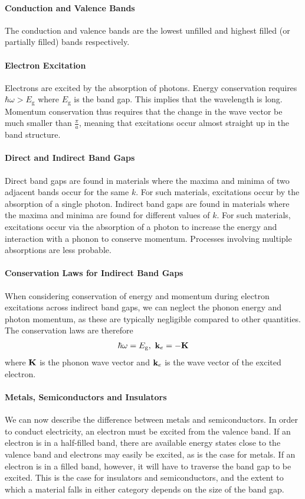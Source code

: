 \paragraph{Conduction and Valence Bands}
The conduction and valence bands are the lowest unfilled and highest filled (or partially filled) bands respectively.

\paragraph{Electron Excitation}
Electrons are excited by the absorption of photons. Energy conservation requires $\hbar\omega > E_{\text{g}}$ where $E_{\text{g}}$ is the band gap. This implies that the wavelength is long. Momentum conservation thus requires that the change in the wave vector be much smaller than $\frac{\pi}{a}$, meaning that excitations occur almost straight up in the band structure.

\paragraph{Direct and Indirect Band Gaps}
Direct band gaps are found in materials where the maxima and minima of two adjacent bands occur for the same $k$. For such materials, excitations occur by the absorption of a single photon. Indirect band gaps are found in materials where the maxima and minima are found for different values of $k$. For such materials, excitations occur via the absorption of a photon to increase the energy and interaction with a phonon to conserve momentum. Processes involving multiple absorptions are less probable.

\paragraph{Conservation Laws for Indirect Band Gaps}
When considering conservation of energy and momentum during electron excitations across indirect band gaps, we can neglect the phonon energy and photon momentum, as these are typically negligible compared to other quantities. The conservation laws are therefore
\begin{align*}
	\hbar\omega = E_{\text{g}},\ \vb{k}_{e} = -\vb{K}
\end{align*}
where $\vb{K}$ is the phonon wave vector and $\vb{k}_{e}$ is the wave vector of the excited electron.

\paragraph{Metals, Semiconductors and Insulators}
We can now describe the difference between metals and semiconductors. In order to conduct electricity, an electron must be excited from the valence band. If an electron is in a half-filled band, there are available energy states close to the valence band and electrons may easily be excited, as is the case for metals. If an electron is in a filled band, however, it will have to traverse the band gap to be excited. This is the case for insulators and semiconductors, and the extent to which a material falls in either category depends on the size of the band gap.

